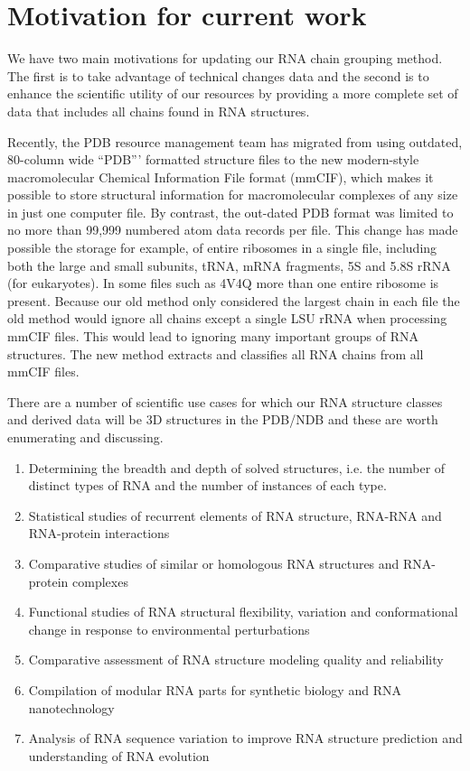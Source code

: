 \section{Motivation for current work}

We have two main motivations for updating our RNA chain grouping method. The
first is to take advantage of technical changes data and the second is to
enhance the scientific utility of our resources by providing a more complete set
of data that includes all chains found in RNA structures.

Recently, the PDB resource management team has migrated from using outdated,
80-column wide ``PDB''' formatted structure files to the new modern-style
macromolecular Chemical Information File format (mmCIF), which makes it possible
to store structural information for macromolecular complexes of any size in just
one computer file. By contrast, the out-dated PDB format was limited to no more
than 99,999 numbered atom data records per file. This change has made possible
the storage for example, of entire ribosomes in a single file, including both
the large and small subunits, tRNA, mRNA fragments, 5S and 5.8S rRNA (for
eukaryotes). In some files such as 4V4Q \cite{Schuwirth2005} more than one
entire ribosome is present. Because our old method only considered the largest
chain in each file the old method would ignore all chains except a single LSU
rRNA when processing mmCIF files. This would lead to ignoring many important
groups of RNA structures. The new method extracts and classifies all RNA chains
from all mmCIF files.

There are a number of scientific use cases for which our RNA structure classes
and derived data will be  3D structures in the PDB/NDB and these are worth
enumerating and discussing.

\begin{enumerate}
  \item Determining the breadth and depth of solved structures, i.e. the number of
    distinct types of RNA and the number of instances of each type.

  \item Statistical studies of recurrent elements of RNA structure, RNA-RNA and
    RNA-protein interactions

  \item Comparative studies of similar or homologous RNA structures and
    RNA-protein complexes

  \item Functional studies of RNA structural flexibility, variation and
    conformational change in response to environmental perturbations

  \item Comparative assessment of RNA structure modeling quality and reliability

  \item Compilation of modular RNA parts for synthetic biology and RNA
    nanotechnology

  \item Analysis of RNA sequence variation to improve RNA structure prediction
    and understanding of RNA evolution
\end{enumerate}

